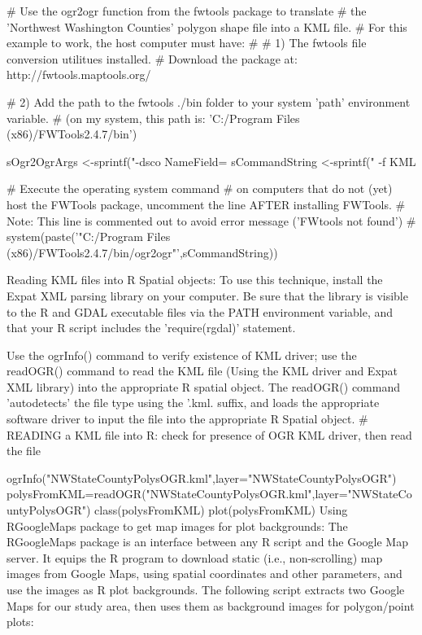 # Use the ogr2ogr function from the fwtools package to translate 
# the 'Northwest Washington Counties' polygon shape file into a KML file.
# For this example to work, the host computer must have: 
# 
# 1) The fwtools file conversion utilitues installed. 
#    Download the package at:   http://fwtools.maptools.org/

# 2) Add the path to the fwtools ./bin folder to your system 'path' environment variable.
#    (on my system, this path is: 'C:/Program Files (x86)/FWTools2.4.7/bin')

   sOgr2OgrArgs <-sprintf("-dsco NameField=%
   sCommandString <-sprintf(" -f KML %

# Execute the operating system command
# on computers that do not (yet) host the FWTools package, uncomment the line AFTER installing FWTools.
# Note: This line is commented out to avoid error message ('FWtools not found')   
#   system(paste('"C:/Program Files (x86)/FWTools2.4.7/bin/ogr2ogr"',sCommandString)) 

Reading KML files into R Spatial objects:
To use this technique, install the Expat XML parsing library on your computer. Be sure that the library is visible to the R and GDAL executable files via the PATH environment variable, and that your R script includes the 'require(rgdal)' statement. 

Use the ogrInfo() command to verify existence of KML driver; use the readOGR() command to read the KML file (Using the KML driver and Expat XML library) into the appropriate R spatial object. The readOGR() command 'autodetects' the file type using the '.kml. suffix, and loads the appropriate software driver to input the file into the appropriate R Spatial object.
# READING a KML file into R: check for presence of OGR KML driver, then read the file

ogrInfo("NWStateCountyPolysOGR.kml",layer="NWStateCountyPolysOGR")
polysFromKML=readOGR("NWStateCountyPolysOGR.kml",layer="NWStateCountyPolysOGR") class(polysFromKML)
plot(polysFromKML) 
Using RGoogleMaps package to get map images for plot backgrounds:
The RGoogleMaps package is an interface between any R script and the Google Map server. It equips the R program to download static (i.e., non-scrolling) map images from Google Maps, using spatial coordinates and other parameters, and use the images as R plot backgrounds. The following script extracts two Google Maps for our study area, then uses them as background images for polygon/point plots:

